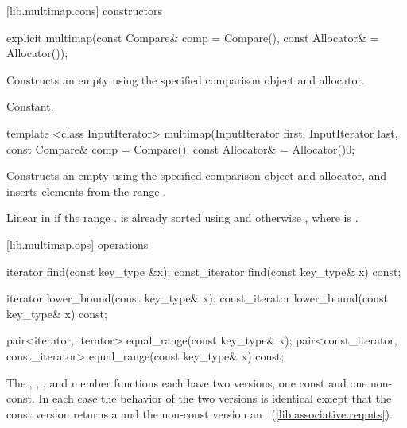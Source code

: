 [lib.multimap.cons]{ constructors}

%
%
\begin{itemdecl}
explicit multimap(const Compare& comp = Compare(),
                  const Allocator& = Allocator());
\end{itemdecl}

\begin{itemdescr}
\pnum
\effects
Constructs an empty
using the specified comparison object and allocator.

\pnum
\complexity
Constant.
\end{itemdescr}

%
%
\begin{itemdecl}
template <class InputIterator>
  multimap(InputIterator first, InputIterator last,
           const Compare& comp = Compare(),
           const Allocator& = Allocator()0;
\end{itemdecl}

\begin{itemdescr}
\pnum
\effects
Constructs an empty
using the specified comparison object and allocator,
and inserts elements from the range
.

\pnum
\complexity
Linear in  if the range
.
is already sorted using 
and otherwise ,
where  is
.
\end{itemdescr}

[lib.multimap.ops]{ operations}

%
%
\begin{itemdecl}
iterator       find(const key_type &x);
const_iterator find(const key_type& x) const;

iterator       lower_bound(const key_type& x);
const_iterator lower_bound(const key_type& x) const;

pair<iterator, iterator>
  equal_range(const key_type& x);
pair<const_iterator, const_iterator>
  equal_range(const key_type& x) const;
\end{itemdecl}

\begin{itemdescr}
\pnum
The
,
,
,
and
member functions each have two versions, one const and one non-const.
In each case the behavior of the two versions is identical
except that the const version returns a
and the non-const version an
~(\ref{lib.associative.reqmts}).
\end{itemdescr}

